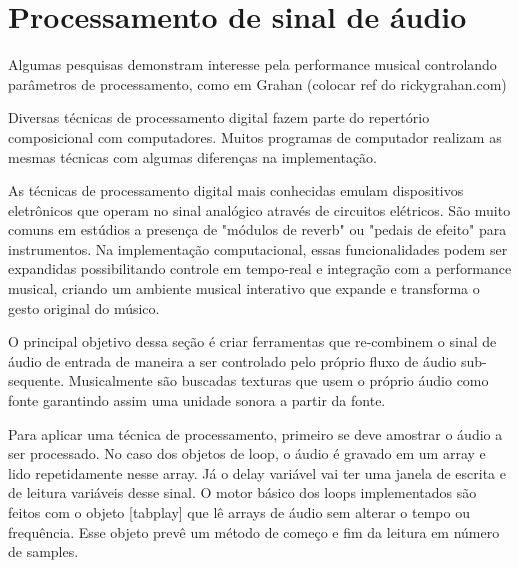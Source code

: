 \documentclass{ppgmus}
\begin{document}
\pagebreak

\section{Processamento de sinal de áudio}


Algumas pesquisas demonstram interesse pela 
performance musical controlando parâmetros de processamento, como
em Grahan (colocar ref do rickygrahan.com)




Diversas técnicas de processamento digital fazem parte do repertório
composicional com computadores. Muitos programas de computador realizam
as mesmas técnicas com algumas diferenças na implementação.

As técnicas de processamento digital mais conhecidas emulam dispositivos
eletrônicos que operam no sinal analógico através de circuitos elétricos.
São muito comuns em estúdios a presença de "módulos de reverb" ou 
"pedais de efeito" para instrumentos. Na implementação computacional,
essas funcionalidades podem ser expandidas possibilitando controle em
tempo-real e integração com a performance musical, criando um ambiente
musical interativo que expande e transforma o gesto original do músico.

O principal objetivo dessa seção é criar ferramentas que re-combinem
o sinal de áudio de entrada de maneira a ser controlado pelo próprio
fluxo de áudio sub-sequente. Musicalmente são buscadas texturas que usem
o próprio áudio como fonte garantindo assim uma unidade sonora a partir da fonte.

Para aplicar uma técnica de processamento, primeiro se deve amostrar
o áudio a ser processado. No caso dos objetos de loop, o áudio é gravado
em um array e lido repetidamente nesse array. Já o delay variável vai ter uma
janela de escrita e de leitura variáveis desse sinal. O motor básico dos loops 
implementados são feitos com o objeto [tabplay\texttildelow] que lê arrays
de áudio sem alterar o tempo ou frequência. Esse objeto prevê um método de começo e fim
da leitura em número de samples.
\end{document}
